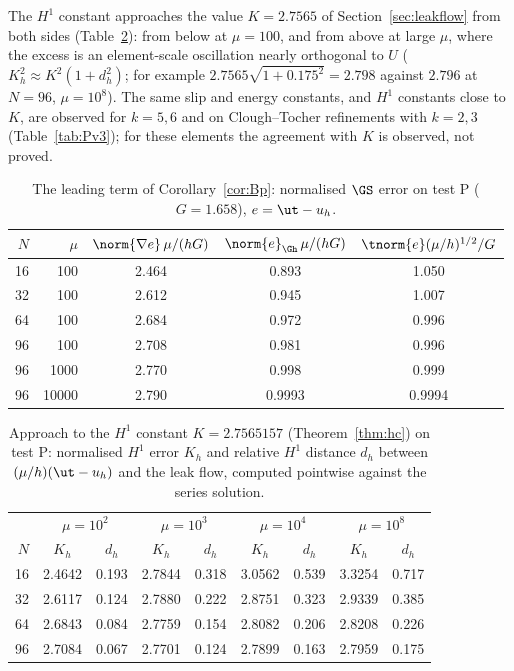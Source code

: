 The $H^1$ constant approaches the value $K=2.7565$ of Section~\ref{sec:leakflow} from both sides (Table~\ref{tab:hc}): from below at $\mu=100$, and from above at large $\mu$, where the excess is an element-scale oscillation nearly orthogonal to $U$ ($K_h^2\approx K^2(1+d_h^2)$; for example $2.7565\sqrt{1+0.175^2}=2.798$ against $2.796$ at $N=96$, $\mu=10^8$). The same slip and energy constants, and $H^1$ constants close to $K$, are observed for $k=5,6$ and on Clough--Tocher refinements with $k=2,3$ (Table~\ref{tab:Pv3}); for these elements the agreement with $K$ is observed, not proved.

\begin{table}[t]
\centering\small
\caption{The leading term of Corollary~\ref{cor:Bp}: normalised $\GS$ error on test P ($G=1.658$), $e=\ut-u_h$.}\label{tab:P}
\begin{tabular}{rrccc}
\toprule
$N$ & $\mu$ & $\norm{\nabla e}\,\mu/(hG)$ & $\norm{e}_{\Gh}\,\mu/(hG)$ & $\tnorm{e}(\mu/h)^{1/2}/G$\\
\midrule
16 & 100 & 2.464 & 0.893 & 1.050\\
32 & 100 & 2.612 & 0.945 & 1.007\\
64 & 100 & 2.684 & 0.972 & 0.996\\
96 & 100 & 2.708 & 0.981 & 0.996\\
96 & 1000 & 2.770 & 0.998 & 0.999\\
96 & 10000 & 2.790 & 0.9993 & 0.9994\\
\bottomrule
\end{tabular}
\end{table}

\begin{table}[t]
\centering\small
\caption{Approach to the $H^1$ constant $K=2.7565157$ (Theorem~\ref{thm:hc}) on test P: normalised $H^1$ error $K_h$ and relative $H^1$ distance $d_h$ between $(\mu/h)(\ut-u_h)$ and the leak flow, computed pointwise against the series solution.}\label{tab:hc}
\begin{tabular}{r|cc|cc|cc|cc}
\toprule
 & \multicolumn{2}{c|}{$\mu=10^2$} & \multicolumn{2}{c|}{$\mu=10^3$} & \multicolumn{2}{c|}{$\mu=10^4$} & \multicolumn{2}{c}{$\mu=10^8$}\\
$N$ & $K_h$ & $d_h$ & $K_h$ & $d_h$ & $K_h$ & $d_h$ & $K_h$ & $d_h$\\
\midrule
16 & 2.4642 & 0.193 & 2.7844 & 0.318 & 3.0562 & 0.539 & 3.3254 & 0.717\\
32 & 2.6117 & 0.124 & 2.7880 & 0.222 & 2.8751 & 0.323 & 2.9339 & 0.385\\
64 & 2.6843 & 0.084 & 2.7759 & 0.154 & 2.8082 & 0.206 & 2.8208 & 0.226\\
96 & 2.7084 & 0.067 & 2.7701 & 0.124 & 2.7899 & 0.163 & 2.7959 & 0.175\\
\bottomrule
\end{tabular}
\end{table}

